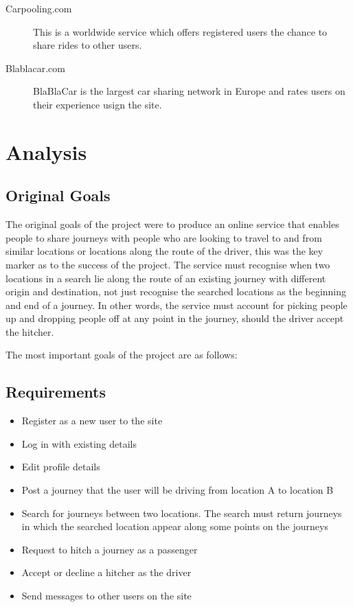 	\begin{description}
	\item[Carpooling.com] This is a worldwide service which offers registered users the chance to share rides to other users.
	\item[Blablacar.com] BlaBlaCar is the largest car sharing network in Europe and rates users on their experience usign the site.
	\end{description}
	

\section{Analysis}

\subsection{Original Goals}
	The original goals of the project were to produce an online service that enables people to share journeys with people who are looking to travel to and from similar locations or locations along the route of the driver, this was the key marker as to the success of the project. The service must recognise when two locations in a search lie along the route of an existing journey with different origin and destination, not just recognise the searched locations as the beginning and end of a journey. In other words, the service must account for picking people up and dropping people off at any point in the journey, should the driver accept the hitcher.

The most important goals of the project are as follows:
	
\subsection{Requirements}
\begin{itemize}
\item Register as a new user to the site
\item Log in with existing details
\item Edit profile details
\item Post a journey that the user will be driving from location A to location B
\item Search for journeys between two locations. The search must return journeys in which the searched location appear along some points on the journeys
\item Request to hitch a journey as a passenger
\item Accept or decline a hitcher as the driver
\item Send messages to other users on the site
\end{itemize}

